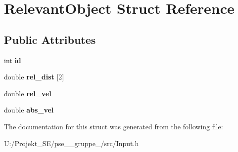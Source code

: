 \hypertarget{struct_relevant_object}{}\section{Relevant\+Object Struct Reference}
\label{struct_relevant_object}
\subsection*{Public Attributes}
\begin{DoxyCompactItemize}
\item 
\mbox{\label{struct_relevant_object_aa449632115c90a676906a10b55950ab9}} 
int {\bfseries id}
\item 
\mbox{\label{struct_relevant_object_afb301a3e3c031ee7b3f800e33ca66595}} 
double {\bfseries rel\+\_\+dist} \mbox{[}2\mbox{]}
\item 
\mbox{\label{struct_relevant_object_ad861a9b943a9d3537f337c40e8857246}} 
double {\bfseries rel\+\_\+vel}
\item 
\mbox{\label{struct_relevant_object_ae17dd157c99bd3de3dfba5cdc6d1fe6d}} 
double {\bfseries abs\+\_\+vel}
\end{DoxyCompactItemize}


The documentation for this struct was generated from the following file\+:\begin{DoxyCompactItemize}
\item 
U\+:/\+Projekt\+\_\+\+S\+E/pse\+\_\+\_\+gruppe\+\_/src/Input.\+h\end{DoxyCompactItemize}
